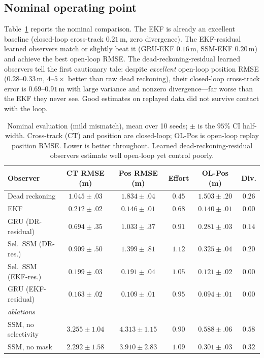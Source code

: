 \documentclass[10pt]{article}
\newcommand{\obs}[1]{\textsc{#1}}
\begin{document}
\subsection{Nominal operating point}
Table~\ref{tab:nominal} reports the nominal comparison. The EKF is already an excellent baseline
(closed-loop cross-track $0.21$\,m, zero divergence). The EKF-residual learned observers match or
slightly beat it (\obs{GRU-EKF} $0.16$\,m, \obs{SSM-EKF} $0.20$\,m) and achieve the best open-loop
RMSE. The dead-reckoning-residual learned observers tell the first cautionary tale: despite
\emph{excellent} open-loop position RMSE ($0.28$--$0.33$\,m, $4$--$5\times$ better than raw dead
reckoning), their closed-loop cross-track error is $0.69$--$0.91$\,m with large variance and
nonzero divergence---far worse than the EKF they never see. Good estimates on replayed data did not
survive contact with the loop.

\begin{table}[t]
\centering\small
\caption{Nominal evaluation (mild mismatch), mean over 10 seeds; $\pm$ is the $95\%$ CI half-width.
Cross-track (CT) and position are closed-loop; OL-Pos is open-loop replay position RMSE. Lower is
better throughout. Learned dead-reckoning-residual observers estimate well open-loop yet control
poorly.}
\label{tab:nominal}
\begin{tabular}{lccccc}
\toprule
Observer & CT RMSE (m) & Pos RMSE (m) & Effort & OL-Pos (m) & Div. \\
\midrule
Dead reckoning        & $1.045\pm.03$ & $1.834\pm.04$ & $0.45$ & $1.503\pm.20$ & $0.26$ \\
EKF                   & $0.212\pm.02$ & $0.146\pm.01$ & $0.68$ & $0.140\pm.01$ & $0.00$ \\
GRU (DR-residual)     & $0.694\pm.35$ & $1.033\pm.37$ & $0.91$ & $0.281\pm.03$ & $0.14$ \\
Sel.\ SSM (DR-res.)   & $0.909\pm.50$ & $1.399\pm.81$ & $1.12$ & $0.325\pm.04$ & $0.20$ \\
Sel.\ SSM (EKF-res.)  & $0.199\pm.03$ & $0.191\pm.04$ & $1.05$ & $0.121\pm.02$ & $0.00$ \\
GRU (EKF-residual)    & $\mathbf{0.163\pm.02}$ & $0.109\pm.01$ & $0.95$ & $\mathbf{0.094\pm.01}$ & $0.00$ \\
\midrule
\multicolumn{6}{l}{\emph{ablations}}\\
SSM, no selectivity   & $3.255\pm1.04$ & $4.313\pm1.15$ & $0.90$ & $0.588\pm.06$ & $0.58$ \\
SSM, no mask          & $2.292\pm1.58$ & $3.910\pm2.83$ & $1.09$ & $0.301\pm.03$ & $0.32$ \\
\bottomrule
\end{tabular}
\end{table}
\end{document}
